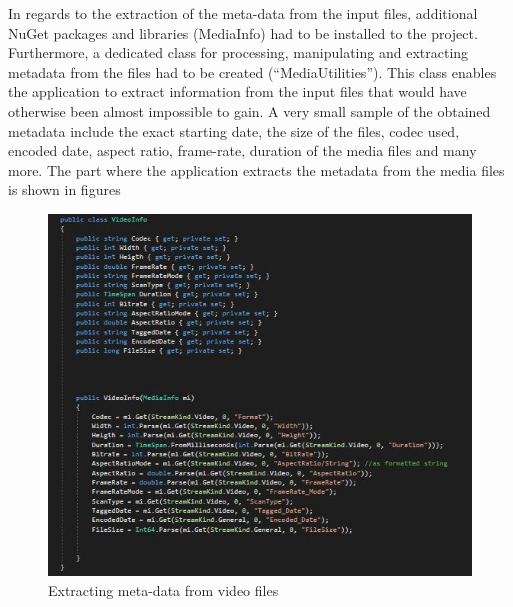 In regards to the extraction of the meta-data from the input files, additional NuGet packages and libraries (MediaInfo) had to be installed to the project. Furthermore, a dedicated class for processing, manipulating and extracting metadata from the files had to be created (``MediaUtilities''). This class enables the application to extract information from the input files that would have otherwise been almost impossible to gain. A very small sample of the obtained metadata include the exact starting date, the size of the files, codec used, encoded date, aspect ratio, frame-rate, duration of the media files and many more. The part where the application extracts the metadata from the media files is shown in figures \


\begin{figure}[!ht]
\begin{center}
\includegraphics[width=17cm]{imgs/video_extracting.jpg}
\end{center}\vspace{-0.3cm}
\caption[Extracting meta-data from video files]{Extracting meta-data from video files} \label{video_extracting}
\end{figure}

